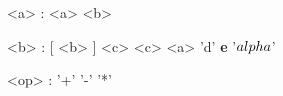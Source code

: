 \begin{grammar}
    <a> : <a> <b>

    <b> : [ <b> ] <c>
    \alt [ <b> ] <c>
    \alt <a> 'd' \textbf{e}
    \alt '$\\alpha$'

    <op> : '+' \alt '-' \alt '*'

\end{grammar}
